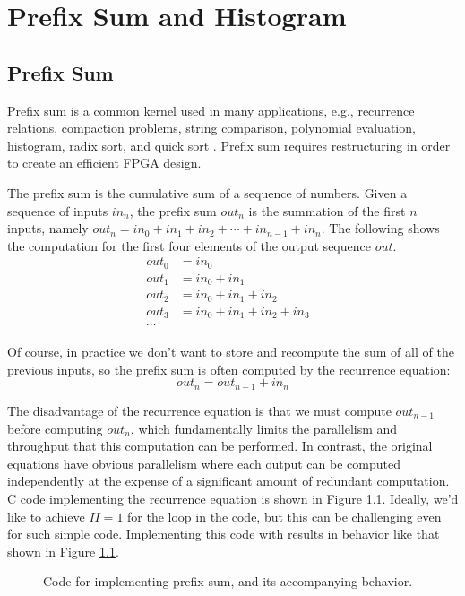 
\chapter{Prefix Sum and Histogram}
\glsresetall
\label{chapter:prefixsum}

\section{Prefix Sum}
\label{sec:prefixSum}

Prefix sum is a common kernel used in many applications, e.g., recurrence relations, 
compaction problems, string comparison, polynomial evaluation, histogram, radix sort, and quick sort \cite{blelloch1990prefix}. Prefix sum requires restructuring in order to create an efficient FPGA design.

The prefix sum is the cumulative sum of a sequence of numbers. Given a sequence of inputs $in_n$, the prefix sum $out_n$ is the summation of the first $n$ inputs, namely $out_n = in_0 + in_1 + in_2 + \cdots + in_{n-1} + in_n$. The following shows the computation for the first four elements of the output sequence $out$.
\begin{align*} 
out_0 & = in_0 &\\
out_1 & = in_0 + in_1 &\\
out_2 & = in_0 + in_1 + in_2 \\
out_3 & = in_0 + in_1 + in_2 + in_3 \\
\cdots
\end{align*}

Of course, in practice we don't want to store and recompute the sum of all of the previous inputs, so the prefix sum is often computed by the recurrence equation:
\begin{equation}
out_n = out_{n-1} + in_n
\end{equation}

The disadvantage of the recurrence equation is that we must compute $out_{n-1}$ before computing $out_n$, which fundamentally limits the parallelism and throughput that this computation can be performed.  In contrast, the original equations have obvious parallelism where each output can be computed independently at the expense of a significant amount of redundant computation.  C code implementing the recurrence equation is shown in Figure \ref{fig:prefixsumSW}. Ideally, we'd like to achieve $II=1$ for the loop in the code, but this can be challenging even for such simple code.  Implementing this code with \VHLS results in behavior like that shown in Figure \ref{fig:prefixsumSW}.
\begin{figure}
\begin{minipage}{.45\textwidth}
{\tiny }
\end{minipage}
\begin{minipage}{.45\textwidth}
\centering
{\tiny }
\end{minipage}
\caption{Code for implementing prefix sum, and its accompanying behavior. }
\label{fig:prefixsumSW}
\end{figure}


